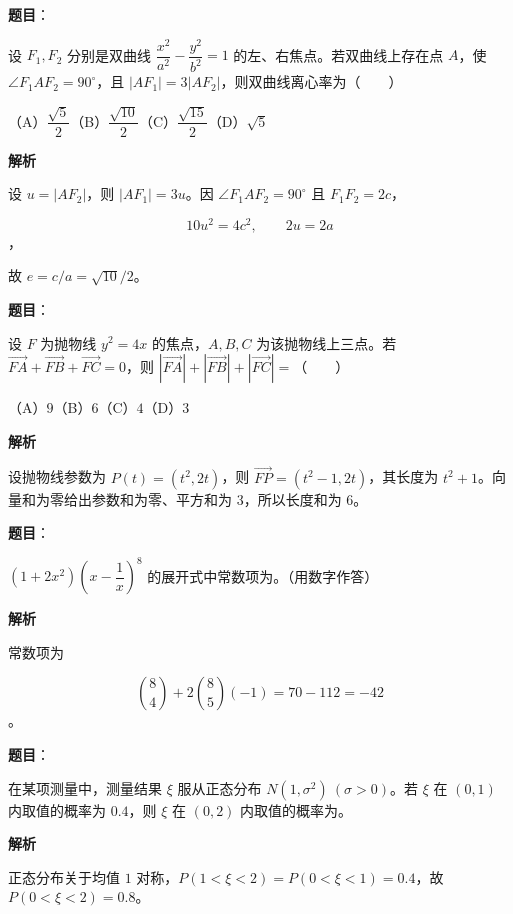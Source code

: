 \begin{answer}

\textbf{题目}：

设 $F_1,F_2$ 分别是双曲线 $\dfrac{x^2}{a^2}-\dfrac{y^2}{b^2}=1$ 的左、右焦点。若双曲线上存在点 $A$，使 $\angle F_1AF_2=90^\circ$，且 $|AF_1|=3|AF_2|$，则双曲线离心率为\mbox{（　　）}

（A）$\dfrac{\sqrt5}{2}$\quad（B）$\dfrac{\sqrt{10}}2$\quad（C）$\dfrac{\sqrt{15}}2$\quad（D）$\sqrt5$

\textbf{解析}

设 $u=|AF_2|$，则 $|AF_1|=3u$。因 $\angle F_1AF_2=90^\circ$ 且 $F_1F_2=2c$，

\nopagebreak[4]
\[
10u^2=4c^2,\qquad 2u=2a
\]
，

故 $e=c/a=\sqrt{10}/2$。


\end{answer}
\begin{answer}

\textbf{题目}：

设 $F$ 为抛物线 $y^2=4x$ 的焦点，$A,B,C$ 为该抛物线上三点。若 $\overrightarrow{FA}+\overrightarrow{FB}+\overrightarrow{FC}=0$，则 $|\overrightarrow{FA}|+|\overrightarrow{FB}|+|\overrightarrow{FC}|=$\mbox{（　　）}

（A）$9$\quad（B）$6$\quad（C）$4$\quad（D）$3$

\textbf{解析}

设抛物线参数为 $P(t)=(t^2,2t)$，则 $\overrightarrow{FP}=(t^2-1,2t)$，其长度为 $t^2+1$。向量和为零给出参数和为零、平方和为 $3$，所以长度和为 $6$。


\end{answer}
\begin{answer}

\textbf{题目}：

$(1+2x^2)\left(x-\dfrac1x\right)^8$ 的展开式中常数项为\gkblank{}。（用数字作答）

\textbf{解析}

常数项为

\nopagebreak[4]
\[
\binom84+2\binom85(-1)=70-112=-42
\]
。


\end{answer}
\begin{answer}

\textbf{题目}：

在某项测量中，测量结果 $\xi$ 服从正态分布 $N(1,\sigma^2)\ (\sigma>0)$。若 $\xi$ 在 $(0,1)$ 内取值的概率为 $0.4$，则 $\xi$ 在 $(0,2)$ 内取值的概率为\gkblank{}。

\textbf{解析}

正态分布关于均值 $1$ 对称，$P(1<\xi<2)=P(0<\xi<1)=0.4$，故 $P(0<\xi<2)=0.8$。


\end{answer}
